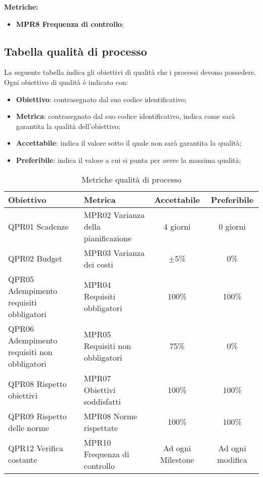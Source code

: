 \documentclass[../piano_di_qualifica.tex]{subfiles}
\begin{document}
\textbf{Metriche:}
\smallbreak
\begin{itemize}
	\item \textbf{MPR8 Frequenza di controllo};
\end{itemize}

\subsection{Tabella qualità di processo}
La seguente tabella indica gli obiettivi di qualità che i processi devono possedere.\\
Ogni obiettivo di qualità è indicato con:
\smallbreak
\begin{itemize}
	\item \textbf{Obiettivo}: contrasegnato dal suo codice identificativo;
	\item \textbf{Metrica}: contrasegnato dal suo codice identificativo, indica come sarà garantita la qualità dell'obiettivo;
	\item \textbf{Accettabile}: indica il valore sotto il quale non sarà garantita la qualità;
	\item \textbf{Preferibile}: indica il valore a cui si punta per avere la massima qualità;
\end{itemize}

\begin{table}[!ht]
	\centering
	\begin{tabular}{|p{3.5cm}|p{3.5cm}|c|c|}
		\hline
		\rowcolor{lightgray}
		\textbf{Obiettivo}  & \textbf{Metrica} & \textbf{Accettabile} & \textbf{Preferibile} \\
		\hline
		QPR01 Scadenze & MPR02 Varianza della pianificazione  & 4 giorni  & 0 giorni   \\
		\hline
		QPR02 Budget   & MPR03 Varianza dei costi   &  $\pm$5\%    & 0\%  \\
		\hline
		QPR05 Adempimento requisiti obbligatori  & MPR04 Requisiti obbligatori     & 100\%  & 100\%   \\
		\hline
		QPR06 Adempimento requisiti non obbligatori & MPR05 Requisiti non obbligatori & 75\%   & 0\%     \\
		\hline
		QPR08 Rispetto obiettivi   & MPR07 Obiettivi soddisfatti     & 100\%   & 100\%   \\
		\hline
		QPR09 Rispetto delle norme  & MPR08 Norme rispettate   & 100\%  & 100\%   \\
		\hline
		QPR12 Verifica costante   & MPR10 Frequenza di controllo    & Ad ogni Milestone    & Ad ogni modifica     \\
		\hline
	\end{tabular}
	\caption{Metriche qualità di processo}
\end{table}
\end{document}
